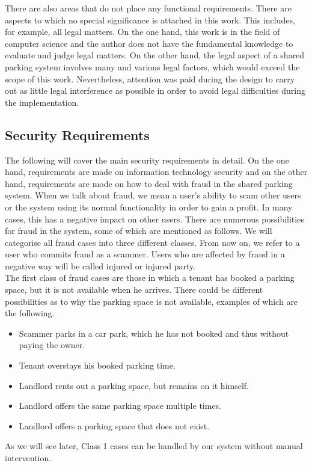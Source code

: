 \documentclass[
a4paper,     %
titlepage,   %
14pt         %
]{scrartcl}  %
\theoremstyle{mystyle}
\begin{document}
There are also areas that do not place any functional requirements. There are aspects to which no special significance is attached in this work. This includes, for example, all legal matters. On the one hand, this work is in the field of computer science and the author does not have the fundamental knowledge to evaluate and judge legal matters. On the other hand, the legal aspect of a shared parking system involves many and various legal factors, which would exceed the scope of this work. Nevertheless, attention was paid during the design to carry out as little legal interference as possible in order to avoid legal difficulties during the implementation.

\subsection{Security Requirements}
The following will cover the main security requirements in detail.
On the one hand, requirements are made on information technology security and on the other hand, requirements are mode on how to deal with fraud in the shared parking system. When we talk about fraud, we mean a user's ability to scam other users or the system using its normal functionality in order to gain a profit. In many cases, this has a negative impact on other users. There are numerous possibilities for fraud in the system, some of which are mentioned as follows. We will categorise all fraud cases into three different classes. From now on, we refer to a user who commits fraud as a scammer. Users who are affected by fraud in a negative way will be called injured or injured party. \\

The first class of fraud cases are those in which a tenant has booked a parking space, but  it is not available when he arrives. There could be different possibilities as to why the parking space is not available, examples of which are the following.
\begin{itemize}
\item Scammer parks in a car park, which he has not booked and thus without paying the owner.
\item Tenant overstays his booked parking time.
\item Landlord rents out a parking space, but remains on it himself.
\item Landlord offers the same parking space multiple times.
\item Landlord offers a parking space that does not exist.
\end{itemize}
As we will see later, Class 1 cases can be handled by our system without manual intervention. \\
\end{document}
